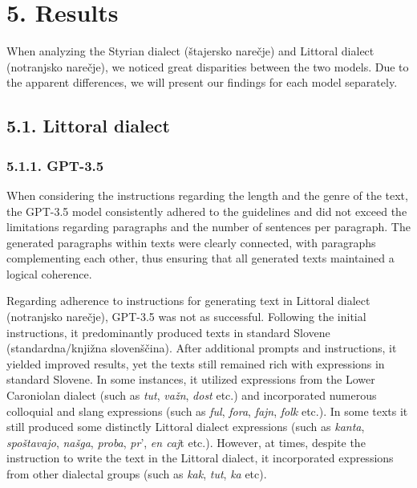 \documentclass[fleqn,moreauthors,10pt]{ds_report}
\begin{document}

\section*{5. Results}

When analyzing the Styrian dialect (štajersko narečje) and Littoral dialect (notranjsko narečje), we noticed great disparities between the two models. Due to the apparent differences, we will present our findings for each model separately.

\subsection*{5.1. Littoral dialect}

\subsubsection{5.1.1. GPT-3.5}

    When considering the instructions regarding the length and the genre of the text, the GPT-3.5 model consistently adhered to the guidelines and did not exceed the limitations regarding paragraphs and the number of sentences per paragraph. The generated paragraphs within texts were clearly connected, with paragraphs complementing each other, thus ensuring that all generated texts maintained a logical coherence. 

    Regarding adherence to instructions for generating text in Littoral dialect (notranjsko narečje), GPT-3.5 was not as successful. Following the initial instructions, it predominantly produced texts in standard Slovene (standardna/knjižna slovenščina). After additional prompts and instructions, it yielded improved results, yet the texts still remained rich with expressions in standard Slovene. In some instances, it utilized expressions from the Lower Caroniolan dialect (such as \textit{tut}, \textit{važn}, \textit{dost} etc.) and incorporated numerous colloquial and slang expressions (such as \textit{ful}, \textit{fora}, \textit{fajn}, \textit{folk} etc.). In some texts it still produced some distinctly Littoral dialect expressions (such as \textit{kanta}, \textit{spoštavajo}, \textit{našga}, \textit{proba}, \textit{pr}', \textit{en caj}t etc.). However, at times, despite the instruction to write the text in the Littoral dialect, it incorporated expressions from other dialectal groups (such as \textit{kak}, \textit{tut}, \textit{ka} etc).
\end{document}
